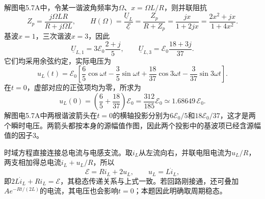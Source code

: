 \documentclass[UTF8,fontset=fandol,a4paper,11pt]{ctexart}
\newcommand{\figcaption}[1]{\par\vspace{2pt}{\small\color{muted}#1}\par}
\begin{document}
\begin{center}\begin{minipage}{.98\linewidth}\centering
{}
\figcaption{解图电5.7A\quad $t=0$取各谐波的实轴投影后相加}
\end{minipage}\end{center}

解图电5.7A中，令某一谐波角频率为$\Omega$、$x=\Omega L/R$，则并联阻抗
\[
 Z_p=\frac{j\Omega LR}{R+j\Omega L},\qquad
 H(\Omega)=\frac{\underline U_L}{\underline{\mathcal E}}
 =\frac{Z_p}{R+Z_p}
 =\frac{jx}{1+2jx}
 =\frac{2x^2+jx}{1+4x^2}.
\]
基波$x=1$，三次谐波$x=3$，因此
\[
 \underline U_{L,1}=3\mathcal E_0\frac{2+j}{5},\qquad
 \underline U_{L,3}=\mathcal E_0\frac{18+3j}{37}.
\]
它们均采用余弦约定，实际电压为
\[
 u_L(t)=\mathcal E_0\left[
 \frac65\cos\omega t-\frac35\sin\omega t
 +\frac{18}{37}\cos3\omega t-\frac3{37}\sin3\omega t\right].
\]
在$t=0$，虚部对应的正弦项均为零，所求为
\[
 \boxed{u_L(0)=\left(\frac65+\frac{18}{37}\right)\mathcal E_0
 =\frac{312}{185}\mathcal E_0
 \simeq1.68649\,\mathcal E_0.}
\]
解图电5.7A中两根谐波箭头在$t=0$的横轴投影分别为$6\mathcal E_0/5$和$18\mathcal E_0/37$，这才是两个瞬时电压。两箭头都按本身的源幅值作图，因此两个投影中的基波项已经含源幅值的因子3。

时域方程直接连接总电流与电感支流。取$i_L$从左流向右，并联电阻电流为$u_L/R$，两支相加得总电流$i_L+u_L/R$，所以
\[
 \mathcal E=R i_L+2u_L,\qquad u_L=L\dot i_L,
\]
即$2L\dot i_L+Ri_L=\mathcal E$，其稳态传递关系与上式一致。若回路刚接通，还可叠加$A e^{-Rt/(2L)}$的电流，其电压也会影响$t=0$；本题因此明确取周期稳态。
\end{document}
